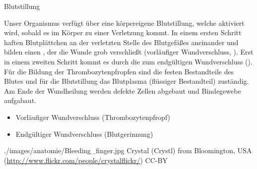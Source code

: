 \TextSlidePicture
{Blutstillung}%
{%
%
Unser Organismus verfügt über eine körpereigene
Blutstillung, welche aktiviert wird, sobald es im Körper zu
einer Verletzung kommt. In einem ersten Schritt
haften Blutplättchen an der verletzten
Stelle des Blutgefäßes aneinander und bilden einen
, der die Wunde grob verschließt
(vorläufiger Wundverschluss, ). Erst
in einem zweiten Schritt kommt es durch die
 zum endgültigen Wundverschluss
(). Für die Bildung der
Thrombozytenpfropfen sind die festen Bestandteile des
Blutes und für die Blutstillung das Blutplasma (flüssiger
Bestandteil) zuständig. Am Ende der Wundheilung werden
defekte Zellen abgebaut und Bindegewebe aufgabaut.


}%
{
\begin{itemize}
  \item Vorläufiger Wundverschluss (Thrombozytenpfropf)
  \item Endgültiger Wundverschluss (Blutgerinnung)
\end{itemize}}%
{./images/anatomie/Bleeding_finger.jpg}%
{}%
{}%
{Crystal
(Crystl) from Bloomington, USA (\url{http://www.flickr.com/people/crystalflickr/})}%
{CC-BY}%



